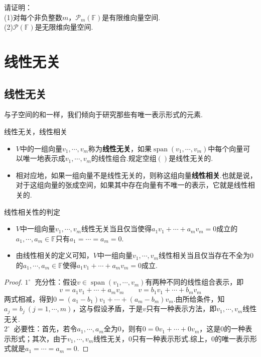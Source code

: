 \documentclass[lang=cn, zihao=5]{elegantbook}
\newcommand{\F}{\mathbb{F}}
\newcommand{\buzhou}[1]{$#1^{\circ} \ $}
\DeclareMathOperator{\spn}{span}
\begin{document}
\begin{example}
	请证明： \\
	(1)对每个非负整数$m$，$\mathcal{P} _{m} (\F)$是有限维向量空间. \\
	(2)$\mathcal{P} (\F)$是无限维向量空间.
\end{example}

\newpage
\section{线性无关}

\subsection{线性无关}

与子空间的和一样，我们倾向于研究那些有唯一表示形式的元素.

\begin{definition}{线性无关，线性相关}
	\begin{itemize}
		\item $V$中的一组向量$v_1, \cdots , v_m$称为\textbf{线性无关}，如果$\spn (v_1, \cdots ,v_m)$中每个向量可以唯一地表示成$v_1, \cdots ,v_m$的线性组合.规定空组$()$是线性无关的.
		\item 相对应地，如果一组向量不是线性无关的，则称这组向量\textbf{线性相关}.也就是说，对于这组向量的张成空间，如果其中存在向量有不唯一的表示，它就是线性相关的.
	\end{itemize}
\end{definition}

\begin{proposition}{线性相关性的判定}
	\begin{itemize}
		\item $V$中一组向量$v_1, \cdots ,v_m$线性无关当且仅当使得$a_1v_1 + \cdots + a_mv_m = 0$成立的$a_1 , \cdots ,a_m \in \F$只有$a_1= \cdots =a_m =0$.
		\item 由线性相关的定义可知，$V$中一组向量$v_1, \cdots ,v_m$线性相关当且仅当存在不全为$0$的$a_1 , \cdots ,a_m \in \F$使得$a_1v_1 + \cdots + a_mv_m = 0$成立.
	\end{itemize}
\end{proposition}
\begin{proof}
	\buzhou{1} 充分性：假设$v \in \spn (v_1, \cdots , v_m)$有两种不同的线性组合表示，即
	$$v = a_1v_1 + \cdots + a_mv_m \qquad v = b_1v_1 + \cdots + b_mv_m$$
	两式相减，得到$0=(a_1-b_1)v_1 + \cdots + (a_m-b_m)v_m$.由所给条件，知$a_j=b_j ~(j=1,\cdots ,m)$，这与假设矛盾，于是$v$只有一种表示方法，即$v_1, \cdots ,v_m$线性无关. \\
	\buzhou{2} 必要性：首先，若令$a_1, \cdots , a_m$全为$0$，则有$0=0v_1 + \cdots + 0v_m$，这是$0$的一种表示形式；其次，由于$v_1, \cdots ,v_m$线性无关，$0$只有一种表示形式.综上，$0$的唯一表示形式就是$a_1= \cdots = a_m =0$.
\end{proof}
\end{document}
